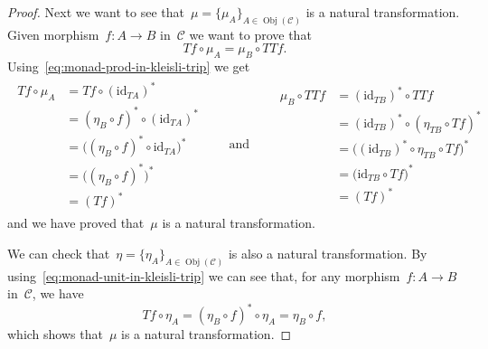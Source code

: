 \documentclass[a4paper]{article}
\theoremstyle{plain}
\theoremstyle{definition}
\DeclareMathOperator{\Obj}{Obj}
\newcommand{\id}{\mathrm{id}}
\newcommand{\cat}[1]{\mathcal{#1}}
\begin{document}
\begin{proof}
    Next we want to see that~\(\mu=\{\mu_{A}\}_{A\in\Obj(\cat{C})}\) is a
    natural transformation.
    Given morphism~\(f:A\longrightarrow B\) in~\(\cat{C}\) we want to prove that
    \[
        Tf \circ \mu_{A} = \mu_{B} \circ TTf.
    \]
    Using~\eqref{eq:monad-prod-in-kleisli-trip} we get
    \begin{gather*}
        \begin{split}
            Tf \circ \mu_{A} &= Tf \circ (\id_{TA})^{\ast} \\
                &= (\eta_{B} \circ f)^{\ast} \circ (\id_{TA})^{\ast} \\
                &= \bigl((\eta_{B} \circ f)^{\ast} \circ \id_{TA}\bigr)^{\ast} \\
                &= \bigl((\eta_{B} \circ f)^{\ast}\bigr)^{\ast} \\
                &= (Tf)^{\ast}
        \end{split}
        \qquad\text{and}\qquad
        \begin{split}
            \mu_{B} \circ TTf &= (\id_{TB})^{\ast} \circ TTf \\
                &= (\id_{TB})^{\ast} \circ (\eta_{TB} \circ Tf)^{\ast} \\
                &= \bigl((\id_{TB})^{\ast} \circ \eta_{TB} \circ Tf\bigr)^{\ast} \\
                &= \bigl(\id_{TB} \circ Tf\bigr)^{\ast} \\
                &= (Tf)^{\ast}
        \end{split}
    \end{gather*}
    and we have proved that~\(\mu\) is a natural transformation.

    We can check that~\(\eta=\{\eta_{A}\}_{A\in\Obj(\cat{C})}\) is also a
    natural transformation.
    By using~\eqref{eq:monad-unit-in-kleisli-trip} we can see that, for any
    morphism~\(f:A\longrightarrow B\) in~\(\cat{C}\), we have
    \[
        Tf \circ \eta_{A}
        = (\eta_{B}\circ f)^{\ast} \circ \eta_{A}
        = \eta_{B} \circ f,
    \]
    which shows that~\(\mu\) is a natural transformation.


\end{proof}
\end{document}
